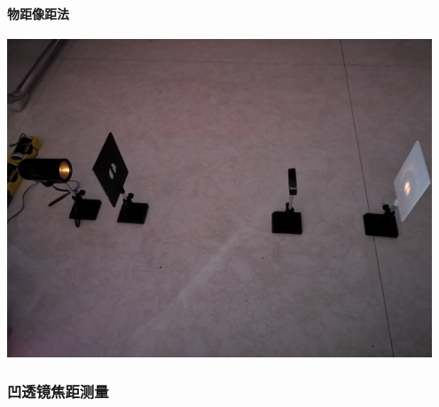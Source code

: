 \documentclass[UTF8]{ctexart}
\begin{document}
\paragraph{物距像距法}
\begin{center} 
\includegraphics[width=0.95\textwidth]{B.jpg} 
\end{center}
\subsubsection{凹透镜焦距测量}
\end{document}
